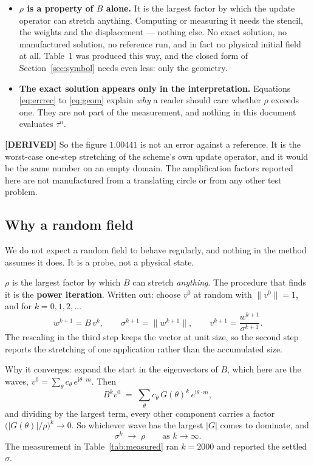 \documentclass[11pt,a4paper]{article}
\newcommand{\derived}{\textcolor{blue!50!black}{\textbf{[DERIVED]}}}
\begin{document}
\begin{itemize}
\item \textbf{\(\rho\) is a property of \(B\) alone.} It is the largest factor by which the
      update operator can stretch anything. Computing or measuring it needs the stencil, the
      weights and the displacement --- nothing else. No exact solution, no manufactured
      solution, no reference run, and in fact no physical initial field at all. Table~1 was
      produced this way, and the closed form of Section~\ref{sec:symbol} needs even less: only
      the geometry.
\item \textbf{The exact solution appears only in the interpretation.} Equations
      \eqref{eq:errrec} to \eqref{eq:geom} explain \emph{why} a reader should care whether
      \(\rho\) exceeds one. They are not part of the measurement, and nothing in this document
      evaluates \(\tau^n\).
\end{itemize}

\derived{} So the figure \(1.00441\) is not an error against a reference. It is the worst-case
one-step stretching of the scheme's own update operator, and it would be the same number on an
empty domain. The amplification factors reported here are not manufactured from a translating
circle or from any other test problem.

\subsection{Why a random field}

We do not expect a random field to behave regularly, and nothing in the method assumes it does.
It is a probe, not a physical state.

\(\rho\) is the largest factor by which \(B\) can stretch \emph{anything}. The procedure that
finds it is the \textbf{power iteration}. Written out: choose \(v^0\) at random with
\(\|v^0\| = 1\), and for \(k = 0,1,2,\dots\)
\begin{equation}
  w^{k+1} = B\,v^{k}, \qquad
  \sigma^{k+1} = \bigl\|w^{k+1}\bigr\|, \qquad
  v^{k+1} = \frac{w^{k+1}}{\sigma^{k+1}} .
  \label{eq:power}
\end{equation}
The rescaling in the third step keeps the vector at unit size, so the second step reports the
stretching of one application rather than the accumulated size.

Why it converges: expand the start in the eigenvectors of \(B\), which here are the waves,
\(v^0 = \sum_\theta c_\theta\,e^{\mathrm{i}\theta\cdot m}\). Then
\begin{equation}
  B^{k} v^{0} \;=\; \sum_\theta c_\theta\, G(\theta)^{k}\, e^{\mathrm{i}\theta\cdot m},
\end{equation}
and dividing by the largest term, every other component carries a factor
\(\bigl(|G(\theta)|/\rho\bigr)^{k} \to 0\). So whichever wave has the largest \(|G|\) comes to
dominate, and
\begin{equation}
  \sigma^{k} \;\longrightarrow\; \rho \qquad\text{as } k \to \infty .
\end{equation}
The measurement in Table~\ref{tab:measured} ran \(k = 2000\) and reported the settled
\(\sigma\).
\end{document}
